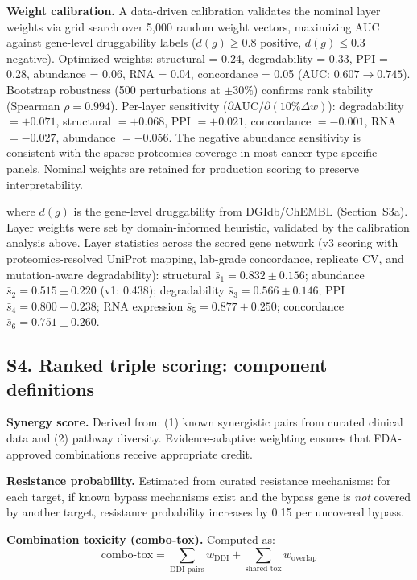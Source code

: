 \documentclass[11pt]{article}
\begin{document}
\textbf{Weight calibration.} A data-driven calibration validates the nominal layer weights via grid search over 5{,}000 random weight vectors, maximizing AUC against gene-level druggability labels ($d(g) \geq 0.8$ positive, $d(g) \leq 0.3$ negative). Optimized weights: structural = 0.24, degradability = 0.33, PPI = 0.28, abundance = 0.06, RNA = 0.04, concordance = 0.05 (AUC: $0.607 \to 0.745$). Bootstrap robustness (500 perturbations at $\pm 30\%$) confirms rank stability (Spearman $\rho = 0.994$). Per-layer sensitivity ($\partial\text{AUC}/\partial(10\%\Delta w)$): degradability $= +0.071$, structural $= +0.068$, PPI $= +0.021$, concordance $= -0.001$, RNA $= -0.027$, abundance $= -0.056$. The negative abundance sensitivity is consistent with the sparse proteomics coverage in most cancer-type-specific panels. Nominal weights are retained for production scoring to preserve interpretability.

where $d(g)$ is the gene-level druggability from DGIdb/ChEMBL (Section~S3a). Layer weights were set by domain-informed heuristic, validated by the calibration analysis above. Layer statistics across the scored gene network (v3 scoring with proteomics-resolved UniProt mapping, lab-grade concordance, replicate CV, and mutation-aware degradability): structural $\bar{s}_1 = 0.832 \pm 0.156$; abundance $\bar{s}_2 = 0.515 \pm 0.220$ (v1: 0.438); degradability $\bar{s}_3 = 0.566 \pm 0.146$; PPI $\bar{s}_4 = 0.800 \pm 0.238$; RNA expression $\bar{s}_5 = 0.877 \pm 0.250$; concordance $\bar{s}_6 = 0.751 \pm 0.260$. %

\subsection{S4. Ranked triple scoring: component definitions}

\textbf{Synergy score.} Derived from: (1) known synergistic pairs from curated clinical data and (2) pathway diversity. Evidence-adaptive weighting ensures that FDA-approved combinations receive appropriate credit.

\textbf{Resistance probability.} Estimated from curated resistance mechanisms: for each target, if known bypass mechanisms exist and the bypass gene is \emph{not} covered by another target, resistance probability increases by 0.15 per uncovered bypass.

\textbf{Combination toxicity (combo-tox).} Computed as:
\[
\text{combo-tox} = \sum_{\text{DDI pairs}} w_{\text{DDI}} + \sum_{\text{shared tox}} w_{\text{overlap}}
\]
\end{document}
